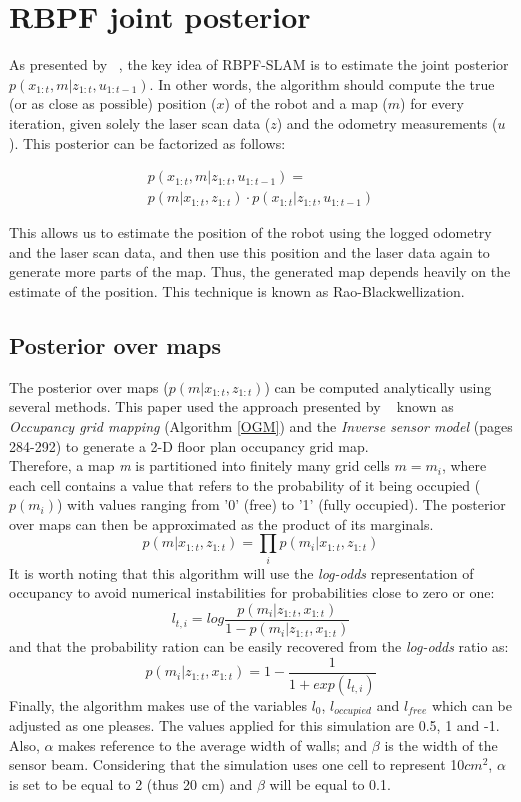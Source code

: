 \documentclass[letterpaper]{article}
\begin{document}
\section{RBPF joint posterior}
As presented by ~\cite{Murphy}, the key idea of RBPF-SLAM is to estimate the joint posterior $p(x_{1:t},m|z_{1:t}, u_{1:t-1})$. In other words, the algorithm should compute the true (or as close as possible) position ($x$) of the robot and a map ($m$) for every iteration, given solely the laser scan data ($z$) and the odometry measurements ($u$). This posterior can be factorized as follows:

\begin{multline}
p(x_{1:t},m|z_{1:t}, u_{1:t-1}) = \\ p(m|x_{1:t},z_{1:t}) \cdot p(x_{1:t}|z_{1:t}, u_{1:t-1})
\end{multline}

This allows us to estimate the position of the robot using the logged odometry and the laser scan data, and then use this position and the laser data again to generate more parts of the map. Thus, the generated map depends heavily on the estimate of the position. This technique is known as Rao-Blackwellization.
\subsection{Posterior over maps}
The posterior over maps ($p(m|x_{1:t},z_{1:t})$) can be computed analytically using several methods. This paper used the approach presented by ~\cite{ProbabilisticRobotics} known as \textit{Occupancy grid mapping} (Algorithm \ref{OGM}) and the \textit{Inverse sensor model} (pages 284-292) to generate a 2-D floor plan occupancy grid map.\\
Therefore, a map \textit{m} is partitioned into finitely many grid cells $m = {m_i}$, where each cell contains a value that refers to the probability of it being occupied ($p(m_i)$) with values ranging from '0' (free) to '1' (fully occupied). The posterior over maps can then be approximated as the product of its marginals.
\begin{equation*} 
p(m|x_{1:t},z_{1:t}) = \prod_{i} p(m_i|x_{1:t},z_{1:t})
\end{equation*}
It is worth noting that this algorithm will use the \textit{log-odds} representation of occupancy to avoid numerical instabilities for probabilities close to zero or one:
\begin{equation*} 
l_{t,i}= log \frac{p(m_i | z_{1:t}, x_{1:t})}{1-p(m_i | z_{1:t}, x_{1:t})}
\end{equation*}
and that the probability ration can be easily recovered from the \textit{log-odds} ratio as:
\begin{equation*} 
p(m_i | z_{1:t}, x_{1:t})= 1- \frac{1}{1+exp(l_{t,i})}
\end{equation*}
Finally, the algorithm makes use of the variables $l_0$, $l_{occupied}$ and $l_{free}$ which can be adjusted as one pleases. The values applied for this simulation are 0.5, 1 and -1. Also, $\alpha$ makes reference to the average width of walls; and $\beta$ is the width of the sensor beam. Considering that the simulation uses one cell to represent 10$cm^2$, $\alpha$ is set to be equal to 2 (thus 20 cm) and $\beta$ will be equal to 0.1.
\end{document}
